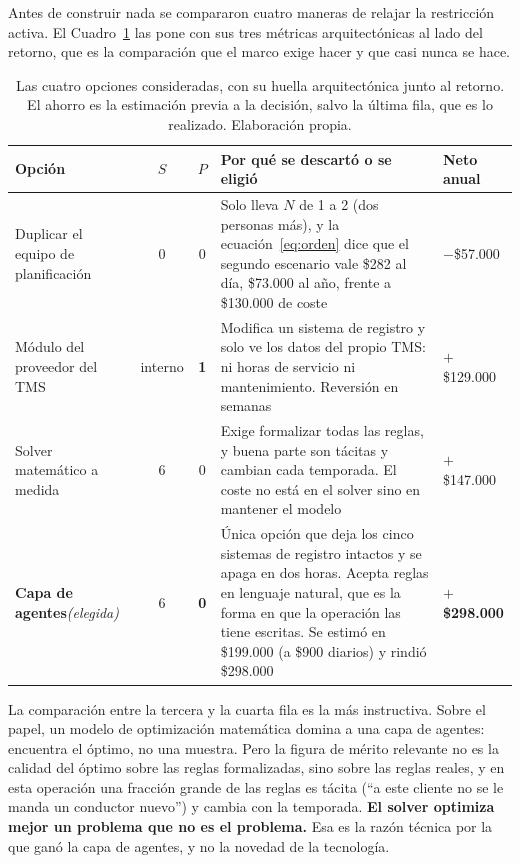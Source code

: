 \documentclass[11pt,letterpaper]{article}
\begin{document}
Antes de construir nada se compararon cuatro maneras de relajar la restricción
activa. El Cuadro~\ref{cuadro:opciones} las pone con sus tres métricas
arquitectónicas al lado del retorno, que es la comparación que el marco exige
hacer y que casi nunca se hace.

\begin{table}[t]
\small
\caption{Las cuatro opciones consideradas, con su huella arquitectónica junto
al retorno. El ahorro es la estimación previa a la decisión, salvo la última
fila, que es lo realizado. Elaboración propia.}
\label{cuadro:opciones}
\begin{tabularx}{\textwidth}{@{}p{3.5cm}ccX>{\raggedleft\arraybackslash}p{2.1cm}@{}}
\toprule
\textbf{Opción} & \textbf{$S$} & \textbf{$P$} & \textbf{Por qué se descartó o
se eligió} & \textbf{Neto anual} \\
\midrule
Duplicar el equipo de planificación
& 0 & 0
& Solo lleva $N$ de 1 a 2 (dos personas más), y la ecuación~\eqref{eq:orden}
  dice que el segundo escenario vale \$282 al día, \$73.000 al año, frente a
  \$130.000 de coste
& $-$\$57.000 \\
\addlinespace[2pt]
Módulo del proveedor del TMS
& interno & \textbf{1}
& Modifica un sistema de registro y solo ve los datos del propio TMS: ni horas
  de servicio ni mantenimiento. Reversión en semanas
& $+$\$129.000 \\
\addlinespace[2pt]
Solver matemático a medida
& 6 & 0
& Exige formalizar todas las reglas, y buena parte son tácitas y cambian cada
  temporada. El coste no está en el solver sino en mantener el modelo
& $+$\$147.000 \\
\addlinespace[2pt]
\textbf{Capa de agentes}\newline\emph{(elegida)}
& 6 & \textbf{0}
& Única opción que deja los cinco sistemas de registro intactos y se apaga en
  dos horas. Acepta reglas en lenguaje natural, que es la forma en que la
  operación las tiene escritas. Se estimó en \$199.000 (a \$900 diarios) y
  rindió \$298.000
& \textbf{$+$\$298.000} \\
\bottomrule
\end{tabularx}
\end{table}

La comparación entre la tercera y la cuarta fila es la más instructiva. Sobre
el papel, un modelo de optimización matemática domina a una capa de agentes:
encuentra el óptimo, no una muestra. Pero la figura de mérito relevante no es
la calidad del óptimo sobre las reglas formalizadas, sino sobre las reglas
reales, y en esta operación una fracción grande de las reglas es tácita
(\enquote{a este cliente no se le manda un conductor nuevo}) y cambia con la
temporada. \textbf{El solver optimiza mejor un problema que no es el
problema.} Esa es la razón técnica por la que ganó la capa de agentes, y no la
novedad de la tecnología.
\end{document}
